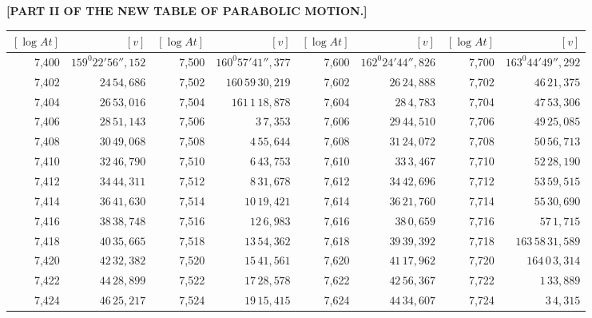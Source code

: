 \clearpage
{}
\begingroup
\centering
\fontsize{9}{9}\selectfont
\setlength{\tabcolsep}{.2pt}
\renewcommand{\arraystretch}{.9}
\setlength{\parskip}{0pt}
\textbf{[PART II OF THE NEW TABLE OF PARABOLIC MOTION.]}
\par\vspace{7pt}
\begin{tabular}{|r|r||r|r||r|r||r|r|}
\hline
\([\log At]\) & \([v]\) & \([\log At]\) & \([v]\) & \([\log At]\) & \([v]\) & \([\log At]\) & \([v]\) \\
\hline
7,400 & \(159^{0}22'56'',\!152\) & 7,500 & \(160^{0}57'41'',\!377\) & 7,600 & \(162^{0}24'44'',\!826\) & 7,700 & \(163^{0}44'49'',\!292\) \\[1pt]
7,402 & \(24\,54,\!686\) & 7,502 & \(160\,59\,30,\!219\) & 7,602 & \(26\,24,\!888\) & 7,702 & \(46\,21,\!375\) \\
7,404 & \(26\,53,\!016\) & 7,504 & \(161\,1\,18,\!878\) & 7,604 & \(28\,4,\!783\) & 7,704 & \(47\,53,\!306\) \\
7,406 & \(28\,51,\!143\) & 7,506 & \(3\,7,\!353\) & 7,606 & \(29\,44,\!510\) & 7,706 & \(49\,25,\!085\) \\
7,408 & \(30\,49,\!068\) & 7,508 & \(4\,55,\!644\) & 7,608 & \(31\,24,\!072\) & 7,708 & \(50\,56,\!713\) \\
7,410 & \(32\,46,\!790\) & 7,510 & \(6\,43,\!753\) & 7,610 & \(33\,3,\!467\) & 7,710 & \(52\,28,\!190\) \\[1pt]
7,412 & \(34\,44,\!311\) & 7,512 & \(8\,31,\!678\) & 7,612 & \(34\,42,\!696\) & 7,712 & \(53\,59,\!515\) \\
7,414 & \(36\,41,\!630\) & 7,514 & \(10\,19,\!421\) & 7,614 & \(36\,21,\!760\) & 7,714 & \(55\,30,\!690\) \\
7,416 & \(38\,38,\!748\) & 7,516 & \(12\,6,\!983\) & 7,616 & \(38\,0,\!659\) & 7,716 & \(57\,1,\!715\) \\
7,418 & \(40\,35,\!665\) & 7,518 & \(13\,54,\!362\) & 7,618 & \(39\,39,\!392\) & 7,718 & \(163\,58\,31,\!589\) \\
7,420 & \(42\,32,\!382\) & 7,520 & \(15\,41,\!561\) & 7,620 & \(41\,17,\!962\) & 7,720 & \(164\,0\,3,\!314\) \\[1pt]
7,422 & \(44\,28,\!899\) & 7,522 & \(17\,28,\!578\) & 7,622 & \(42\,56,\!367\) & 7,722 & \(1\,33,\!889\) \\
7,424 & \(46\,25,\!217\) & 7,524 & \(19\,15,\!415\) & 7,624 & \(44\,34,\!607\) & 7,724 & \(3\,4,\!315\) \\

\end{tabular}

